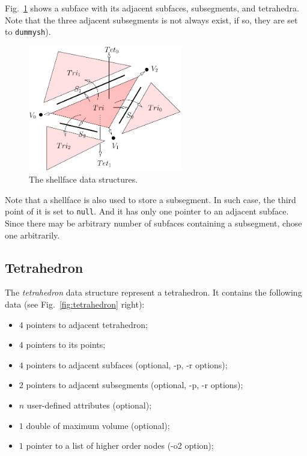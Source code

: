 Fig.~\ref{fig:shellface} shows a subface with its adjacent subfaces, subsegments, and tetrahedra. Note that the three adjacent subsegments is not always exist, if so, they are set to {\tt dummysh}). 

\begin{figure}
  \centering
  \includegraphics[width=0.6\textwidth]{../figs/triang-edge-ds}
\caption{The shellface data structures.}
\label{fig:shellface}
\end{figure}

Note that a shellface is also used to store a subsegment. In such case, the third point of it is set to {\tt null}. And it has only one pointer to an adjacent subface.  Since there may be arbitrary number of subfaces containing a subsegment, chose one arbitrarily.

\subsection{Tetrahedron}

The {\it tetrahedron} data structure represent a tetrahedron. It contains the following data (see Fig.~\ref{fig:tetrahedron} right):
\begin{itemize}
\item $4$ pointers to adjacent tetrahedron;
\item $4$ pointers to its points;
\item $4$ pointers to adjacent subfaces (optional, -p, -r options);
\item $2$ pointers to adjacent subsegments (optional, -p, -r options);
\item $n$ user-defined attributes (optional);
\item $1$ double of maximum volume (optional);
\item $1$ pointer to a list of higher order nodes (-o2 option);
\end{itemize}

